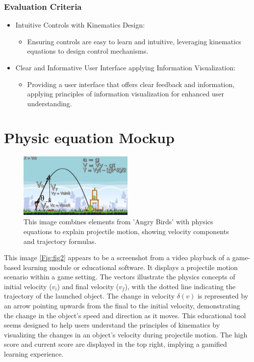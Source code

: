 \documentclass[12pt, titlepage]{article}
\begin{document}
\subsubsection{Evaluation Criteria}
    \begin{itemize}
        \item Intuitive Controls with Kinematics Design:
            \begin{itemize}
                \item Ensuring controls are easy to learn and intuitive, leveraging kinematics equations to design control mechanisms.
            \end{itemize}
            \item Clear and Informative User Interface applying Information Visualization:
                \begin{itemize}
                    \item Providing a user interface that offers clear feedback and information, applying principles of information visualization for enhanced user understanding.
                \end{itemize}
    \end{itemize}

\section{Physic equation Mockup}



\begin{figure}[H]
\centering
\includegraphics[width=0.5\textwidth]{fig1.jpg}
\caption{This image combines elements from 'Angry Birds' with physics equations to explain projectile motion, showing velocity components and trajectory formulas.}
\label{Fig:fig1}
\end{figure}


This image \ref{Fig:fig2} appears to be a screenshot from a video playback of a game-based learning module or educational software. It displays a projectile motion scenario within a game setting. The vectors illustrate the physics concepts of initial velocity ($v_i$) and final velocity ($v_f$), with the dotted line indicating the trajectory of the launched object. The change in velocity $\delta(v)$ is represented by an arrow pointing upwards from the final to the initial velocity, demonstrating the change in the object's speed and direction as it moves. This educational tool seems designed to help users understand the principles of kinematics by visualizing the changes in an object's velocity during projectile motion. The high score and current score are displayed in the top right, implying a gamified learning experience.
\end{document}
